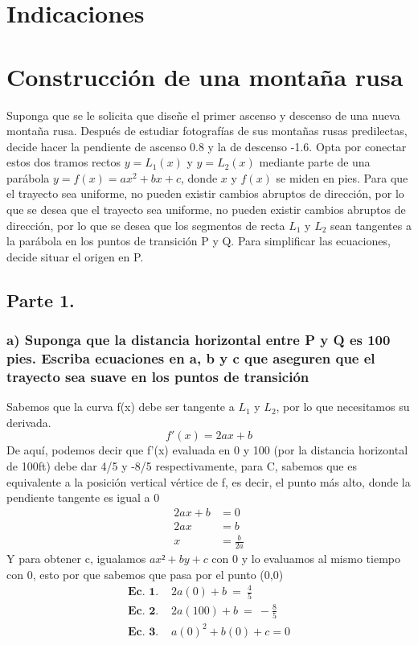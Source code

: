 \documentclass[11pt,letterpaper]{article}
\begin{document}
\section*{Indicaciones}

\section{Construcción de una montaña rusa}
Suponga que se le solicita que diseñe el primer ascenso y descenso de una nueva montaña rusa. Después de estudiar fotografías de sus montañas rusas predilectas, decide hacer la pendiente de ascenso 0.8 y la de descenso -1.6. Opta por conectar estos dos tramos rectos $y=L_1(x)$ y $y=L_2(x)$ mediante parte de una parábola $y=f(x)=ax^2+bx+c$, donde $x$ y $f(x)$ se miden en pies. Para que el trayecto sea uniforme, no pueden existir cambios abruptos de dirección, por lo que se desea que el trayecto sea uniforme, no pueden existir cambios abruptos de dirección, por lo que se desea que los segmentos de recta $L_1$ y $L_2$ sean tangentes a la parábola en los puntos de transición P y Q.
Para simplificar las ecuaciones, decide situar el origen en P.

\subsection{Parte 1.}
\subsubsection{a) Suponga que la distancia horizontal entre P y Q es 100 pies. Escriba ecuaciones en a, b y c que aseguren que el trayecto sea suave en los puntos de transición}
Sabemos que la curva f(x) debe ser tangente a $L_1$ y $L_2$, por lo que necesitamos su derivada.
\begin{equation*}
  f'(x)=2ax+b
\end{equation*}
De aquí, podemos decir que f'(x) evaluada en 0 y 100 (por la distancia horizontal de 100ft) debe dar 4/5 y -8/5 respectivamente, para C, sabemos que es equivalente a la posición vertical vértice de f, es decir, el punto más alto, donde la pendiente tangente es igual a 0
\begin{equation*}
  \begin{split}
    2ax+b &= 0 \\
    2ax &= b \\
    x &= \frac{b}{2a}
  \end{split}
\end{equation*}
Y para obtener c, igualamos $ax²+by+c$ con 0 y lo evaluamos al mismo tiempo con 0, esto por que sabemos que pasa por el punto (0,0) \\
\begin{equation*}
  \begin{split}
    \textbf{Ec. 1. } & 2a(0)+b \ = \ \frac{4}{5} \\
    \textbf{Ec. 2. } & 2a(100)+b \ = \ -\frac{8}{5} \\
    \textbf{Ec. 3. } & a(0)^2+b(0)+c=0
  \end{split}
\end{equation*}
\end{document}
